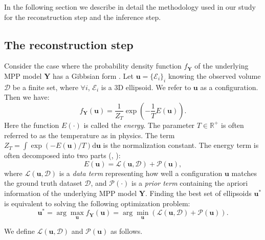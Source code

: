 \documentclass[journal]{IEEEtran}
\newcommand{\dd}[1]{\mathrm{d}#1}%
\begin{document}
In the following section we describe in detail the methodology used in
our study for the reconstruction step and the inference step.

\subsection{The reconstruction step}
\label{sec:reconstr-step:-appr}

Consider the case where the probability density function
$f_{\mathbf{Y}}$ of the underlying MPP model $\mathbf{Y}$ has a
Gibbsian form \cite{moller2007modern}. Let
$\mathbf{u} = \{ \mathcal{E}_i\}_{i}$ knowing the observed volume
$\mathcal{D}$ be a finite set, where $\forall i$, $\mathcal{E}_i$ is a
3D ellipsoid. We refer to $\mathbf{u}$ as a configuration. Then we
have:
\begin{equation}
  \label{eq:gibbs-density}
  f_{\mathbf{Y}}(\mathbf{u}) = \frac{1}{Z_T} \exp \left( - \frac{1}{T}
    E(\mathbf{u}) \right).
\end{equation}
Here the function $E(\cdot)$ is called the \textit{energy}. The
parameter $T \in \mathbb{R}^{+}$ is often referred to as the
temperature as in physics. The term
$Z_T = \int \exp \left( - E(\mathbf{u})/T \right) \dd \mathbf{u}$ is
the normalization constant. The energy term is often decomposed into
two parts (\cite{lafarge2010geometric}, \cite{descombes2009object}):
\begin{equation}
  \label{mpp-energy}
  E(\mathbf{u}) = \mathcal{L}(\mathbf{u}, \mathcal{D})
  + \mathcal{P} (\mathbf{u}),
\end{equation}
where $\mathcal{L}(\mathbf{u}, \mathcal{D})$ is a \textit {data term}
representing how well a configuration $\mathbf{u}$ matches the ground
truth dataset $\mathcal{D}$, and $\mathcal{P} (\cdot)$ is a \textit
{prior term} containing the apriori information of the underlying MPP
model $\mathbf{Y}$. Finding the best set of ellipsoids
$\mathbf{u}^{*}$ is equivalent to solving the following optimization
problem:
\begin{equation}
  \label{mpp-opt-energy}
  \mathbf{u}^{*}
  = \arg \max_{\mathbf{u}}{f_{\mathbf{Y}}(\mathbf{u})}
  = \arg\min_ {\mathbf{u}} \left( \mathcal{L}(\mathbf{u},
    \mathcal{D}) + \mathcal{P} (\mathbf{u}) \right).
\end{equation}

We define $\mathcal{L}(\mathbf{u}, \mathcal{D})$ and
$\mathcal{P} (\mathbf{u})$ as follows.
\end{document}
